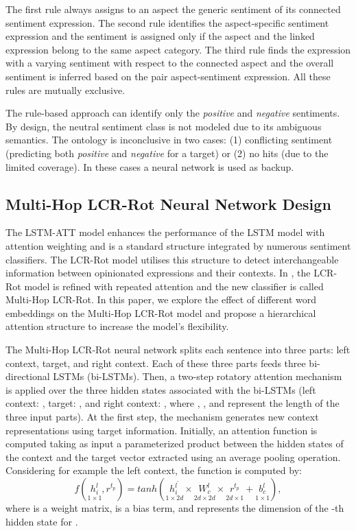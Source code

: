 \documentclass[hidelinks]{llncs}
\begin{document}
The first rule always assigns to an aspect the generic sentiment of its connected sentiment expression. The second rule identifies the aspect-specific sentiment expression and the sentiment is assigned only if the aspect and the linked expression belong to the same aspect category. The third rule finds the expression with a varying sentiment with respect to the connected aspect and the overall sentiment is inferred based on the pair aspect-sentiment expression. All these rules are mutually exclusive. 



The rule-based approach can identify only the \textit{positive} and \textit{negative} sentiments. By design, the neutral sentiment class is not modeled due to its ambiguous semantics. The ontology is inconclusive in two cases: (1) conflicting sentiment (predicting both \textit{positive} and \textit{negative} for a target) or (2) no hits (due to the limited coverage). In these cases a neural network is used as backup.

\subsection{Multi-Hop LCR-Rot Neural Network Design}\label{Multi_Hop}

The LSTM-ATT \cite{he2018exploiting, wang2016attention} model enhances the performance of the LSTM model with attention weighting and is a standard structure integrated by numerous sentiment classifiers. The LCR-Rot model \cite{zheng2018left} utilises this structure to detect interchangeable information between opinionated expressions and their contexts. In \cite{wallaart2019hybrid}, the LCR-Rot model is refined with repeated attention and the new classifier is called Multi-Hop LCR-Rot. In this paper, we explore the effect of different word embeddings on the Multi-Hop LCR-Rot model and propose a hierarchical attention structure to increase the model's flexibility.

The Multi-Hop LCR-Rot neural network splits each sentence into three parts: left context, target, and right context. Each of these three parts feeds three bi-directional LSTMs (bi-LSTMs). Then, a two-step rotatory attention mechanism is applied over the three hidden states associated with the bi-LSTMs (left context: , target: , and right context: , where , , and  represent the length of the three input parts). At the first step, the mechanism generates new context representations using target information. Initially, an attention function  is computed taking as input a parameterized product between the hidden states of the context and the target vector  extracted using an average pooling operation. Considering for example the left context, the function  is computed by: 
\begin {equation}
\label{equation1}
f(\underset{1 \times 1}{h^l_i}, r^{t_p}) = tanh(\underset{1 \times 2d}{h^{l^'}_i} \times \underset{2d \times 2d}{W_c^l} \times \underset{2d \times 1}{r^{t_p}_{}} + \underset{1 \times 1}{b^l_c}),
\end {equation}
where  is a weight matrix,  is a bias term, and  represents the dimension of the -th hidden state  for .
\end{document}

